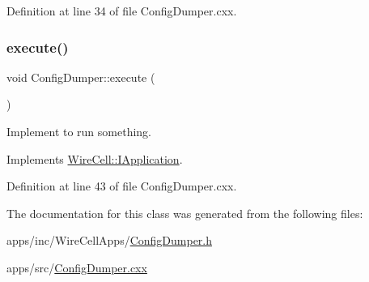 Definition at line 34 of file Config\+Dumper.\+cxx.

\mbox{\label{class_wire_cell_apps_1_1_config_dumper_abed84a041f6b72edd82854534667da56}} 
\subsubsection{\texorpdfstring{execute()}{execute()}}
{\footnotesize\ttfamily void Config\+Dumper\+::execute (\begin{DoxyParamCaption}{ }\end{DoxyParamCaption})\hspace{0.3cm}{\ttfamily [virtual]}}



Implement to run something. 



Implements \hyperlink{class_wire_cell_1_1_i_application_a5c77275a37093541aaad6410d8ce5c31}{Wire\+Cell\+::\+I\+Application}.



Definition at line 43 of file Config\+Dumper.\+cxx.



The documentation for this class was generated from the following files\+:\begin{DoxyCompactItemize}
\item 
apps/inc/\+Wire\+Cell\+Apps/\hyperlink{_config_dumper_8h}{Config\+Dumper.\+h}\item 
apps/src/\hyperlink{_config_dumper_8cxx}{Config\+Dumper.\+cxx}\end{DoxyCompactItemize}

